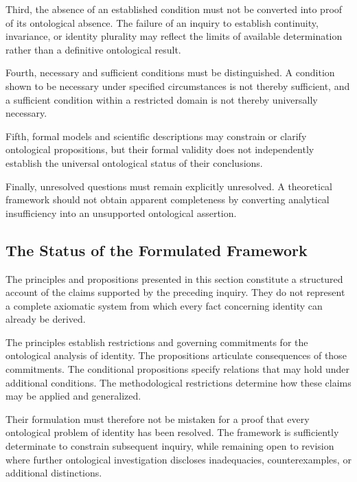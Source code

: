 Third, the absence of an established condition must
not be converted into proof of its ontological absence.
The failure of an inquiry to establish continuity,
invariance, or identity plurality may reflect the limits
of available determination rather than a definitive
ontological result.

Fourth, necessary and sufficient conditions must be
distinguished. A condition shown to be necessary under
specified circumstances is not thereby sufficient, and
a sufficient condition within a restricted domain is
not thereby universally necessary.

Fifth, formal models and scientific descriptions may
constrain or clarify ontological propositions, but their
formal validity does not independently establish the
universal ontological status of their conclusions.

Finally, unresolved questions must remain explicitly
unresolved. A theoretical framework should not obtain
apparent completeness by converting analytical
insufficiency into an unsupported ontological assertion.


\subsection{The Status of the Formulated Framework}

The principles and propositions presented in this
section constitute a structured account of the claims
supported by the preceding inquiry. They do not
represent a complete axiomatic system from which every
fact concerning identity can already be derived.

The principles establish restrictions and governing
commitments for the ontological analysis of identity.
The propositions articulate consequences of those
commitments. The conditional propositions specify
relations that may hold under additional conditions.
The methodological restrictions determine how these
claims may be applied and generalized.

Their formulation must therefore not be mistaken for
a proof that every ontological problem of identity has
been resolved. The framework is sufficiently determinate
to constrain subsequent inquiry, while remaining open
to revision where further ontological investigation
discloses inadequacies, counterexamples, or additional
distinctions.

